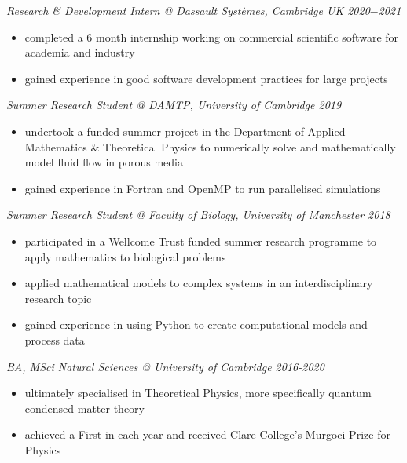 \documentclass[10pt]{article}
\begin{document}
\textsl{Research \& Development Intern @ Dassault Syst\`emes, Cambridge UK \hfill 2020$-$2021}
\begin{itemize}[noitemsep]
\item completed a 6 month internship working on commercial scientific software for academia and industry
\item gained experience in good software development practices for large projects
\end{itemize}

\textsl{Summer Research Student @ DAMTP, University of Cambridge \hfill 2019}
\begin{itemize}[noitemsep]
\item undertook a funded summer project in the Department of Applied Mathematics \& Theoretical Physics to numerically solve and mathematically model fluid flow in porous media
\item gained experience in Fortran and OpenMP to run parallelised simulations
\end{itemize}

\textsl{Summer Research Student @ Faculty of Biology, University of Manchester \hfill 2018}
\begin{itemize}[noitemsep]
\item participated in a Wellcome Trust funded summer research programme to apply mathematics to biological problems
\item applied mathematical models to complex systems in an interdisciplinary research topic
\item gained experience in using Python to create computational models and process data
\end{itemize}

\textsl{BA, MSci Natural Sciences @ University of Cambridge \hfill 2016-2020}
\begin{itemize}[noitemsep]
\item ultimately specialised in Theoretical Physics, more specifically quantum condensed matter theory
\item achieved a First in each year and received Clare College's Murgoci Prize for Physics
\end{itemize}

\end{document}
